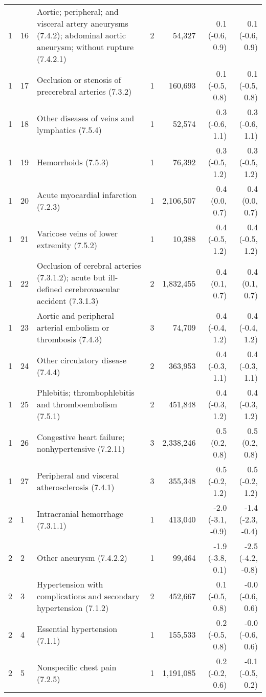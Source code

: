 \begin{tabular}{llp{6.5cm}rrrr}
   1 & 16 & Aortic; peripheral; and visceral artery aneurysms (7.4.2); abdominal aortic aneurysm; without rupture (7.4.2.1) &  2 & 54,327 & 0.1 (-0.6, 0.9) & 0.1 (-0.6, 0.9) \\ 
   1 & 17 & Occlusion or stenosis of precerebral arteries (7.3.2) &  1 & 160,693 & 0.1 (-0.5, 0.8) & 0.1 (-0.5, 0.8) \\ 
   1 & 18 & Other diseases of veins and lymphatics (7.5.4) &  1 & 52,574 & 0.3 (-0.6, 1.1) & 0.3 (-0.6, 1.1) \\ 
   1 & 19 & Hemorrhoids (7.5.3) &  1 & 76,392 & 0.3 (-0.5, 1.2) & 0.3 (-0.5, 1.2) \\ 
   1 & 20 & Acute myocardial infarction (7.2.3) &  1 & 2,106,507 & 0.4 (0.0, 0.7) & 0.4 (0.0, 0.7) \\ 
   1 & 21 & Varicose veins of lower extremity (7.5.2) &  1 & 10,388 & 0.4 (-0.5, 1.2) & 0.4 (-0.5, 1.2) \\ 
   1 & 22 & Occlusion of cerebral arteries (7.3.1.2); acute but ill-defined cerebrovascular accident (7.3.1.3) &  2 & 1,832,455 & 0.4 (0.1, 0.7) & 0.4 (0.1, 0.7) \\ 
   1 & 23 & Aortic and peripheral arterial embolism or thrombosis (7.4.3) &  3 & 74,709 & 0.4 (-0.4, 1.2) & 0.4 (-0.4, 1.2) \\ 
   1 & 24 & Other circulatory disease (7.4.4) &  2 & 363,953 & 0.4 (-0.3, 1.1) & 0.4 (-0.3, 1.1) \\ 
   1 & 25 & Phlebitis; thrombophlebitis and thromboembolism (7.5.1) &  2 & 451,848 & 0.4 (-0.3, 1.2) & 0.4 (-0.3, 1.2) \\ 
   1 & 26 & Congestive heart failure; nonhypertensive (7.2.11) &  3 & 2,338,246 & 0.5 (0.2, 0.8) & 0.5 (0.2, 0.8) \\ 
   1 & 27 & Peripheral and visceral atherosclerosis (7.4.1) &  3 & 355,348 & 0.5 (-0.2, 1.2) & 0.5 (-0.2, 1.2) \\ 
   2 &  1 & Intracranial hemorrhage (7.3.1.1) &  1 & 413,040 & -2.0 (-3.1, -0.9) & -1.4 (-2.3, -0.4) \\ 
   2 &  2 & Other aneurysm (7.4.2.2) &  1 & 99,464 & -1.9 (-3.8, 0.1) & -2.5 (-4.2, -0.8) \\ 
   2 &  3 & Hypertension with complications and secondary hypertension (7.1.2) &  2 & 452,667 & 0.1 (-0.5, 0.8) & -0.0 (-0.6, 0.6) \\ 
   2 &  4 & Essential hypertension (7.1.1) &  1 & 155,533 & 0.2 (-0.5, 0.8) & -0.0 (-0.6, 0.6) \\ 
   2 &  5 & Nonspecific chest pain (7.2.5) &  1 & 1,191,085 & 0.2 (-0.2, 0.6) & -0.1 (-0.5, 0.2) \\ 

\end{tabular}
